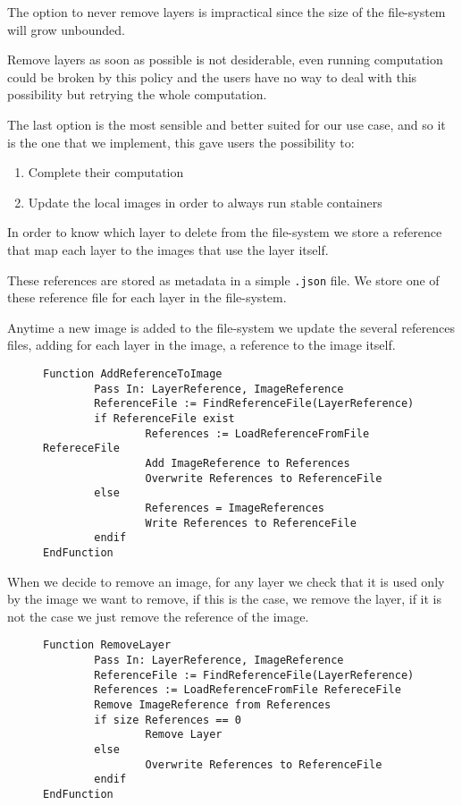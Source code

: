 The option to never remove layers is impractical since the size of the
file-system will grow unbounded.

Remove layers as soon as possible is not desiderable, even running computation
could be broken by this policy and the users have no way to deal with this
possibility but retrying the whole computation.

The last option is the most sensible and better suited for our use case, and so
it is the one that we implement, this gave users the possibility to:
\begin{enumerate}
\item Complete their computation
\item Update the local images in order to always run stable containers
\end{enumerate}

In order to know which layer to delete from the file-system we store a reference
that map each layer to the images that use the layer itself.

These references are stored as metadata in a simple \texttt{.json} file.  We
store one of these reference file for each layer in the file-system.

Anytime a new image is added to the file-system we update the several
references files, adding for each layer in the image, a reference to the image
itself.

\begin{figure}
\begin{lstlisting}[caption={Algorithm to add an image reference to the layer metadata}, label={lst:add-image-reference-to-layer}]
Function AddReferenceToImage
        Pass In: LayerReference, ImageReference
        ReferenceFile := FindReferenceFile(LayerReference)
        if ReferenceFile exist
                References := LoadReferenceFromFile RefereceFile
                Add ImageReference to References
                Overwrite References to ReferenceFile
        else 
                References = ImageReferences
                Write References to ReferenceFile
        endif
EndFunction
\end{lstlisting}
\end{figure}

When we decide to remove an image, for any layer we check that it is used only
by the image we want to remove, if this is the case, we remove the layer, if it
is not the case we just remove the reference of the image.

\begin{figure}
\begin{lstlisting}[caption={Algorithm to remove an image from the file-system}, label={lst:remove-layer}]
Function RemoveLayer
        Pass In: LayerReference, ImageReference
        ReferenceFile := FindReferenceFile(LayerReference)
        References := LoadReferenceFromFile RefereceFile
        Remove ImageReference from References
        if size References == 0
                Remove Layer
        else
                Overwrite References to ReferenceFile
        endif
EndFunction
\end{lstlisting}
\end{figure}

